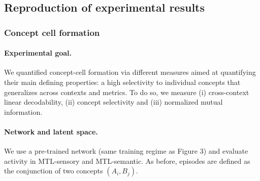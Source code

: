 \documentclass{article}
\begin{document}
\subsection*{Reproduction of experimental results}
\subsubsection*{Concept cell formation }
\paragraph{Experimental goal.}
We quantified concept-cell formation via different measures aimed at quantifying their main defining properties: a high selectivity to individual concepts that generalizes across contexts and metrics. To do so, we measure (i) cross-context linear decodability, (ii) concept selectivity and (iii) normalized mutual information.

\paragraph{Network and latent space.}
We use a pre-trained network (same training regime as Figure 3) and evaluate activity in MTL-sensory and MTL-semantic. As before, episodes are defined as the conjunction of two concepts $(A_i, B_j)$.
\end{document}
